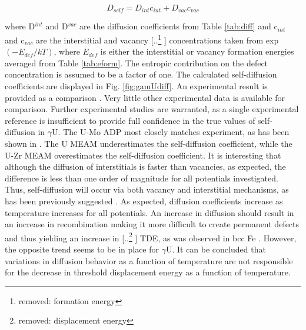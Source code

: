 \documentclass[review]{elsarticle}
\providecommand{\DIFaddtex}[1]{{\protect\color{blue} \sf #1}} %
\providecommand{\DIFdeltex}[1]{{\protect\color{red} [..\footnote{removed: #1} ]}} %
\providecommand{\DIFaddbegin}{} %
\providecommand{\DIFaddend}{} %
\providecommand{\DIFdelbegin}{} %
\providecommand{\DIFdelend}{} %
\providecommand{\DIFadd}[1]{\texorpdfstring{\DIFaddtex{#1}}{#1}} %
\providecommand{\DIFdel}[1]{\texorpdfstring{\DIFdeltex{#1}}{}} %
\newcommand{\DIFscaledelfig}{0.5}
\newlength{\DIFdelgraphicswidth} %
\newlength{\DIFdelgraphicsheight} %
\newcommand{\DIFaddincludegraphics}[2][]{{\color{blue}\fbox{\DIFOincludegraphics[#1]{#2}}}} %
\newcommand{\DIFdelincludegraphics}[2][]{%
\sbox{\DIFdelgraphicsbox}{\DIFOincludegraphics[#1]{#2}}%
\settoboxwidth{\DIFdelgraphicswidth}{\DIFdelgraphicsbox} %
\settoboxtotalheight{\DIFdelgraphicsheight}{\DIFdelgraphicsbox} %
\scalebox{\DIFscaledelfig}{%
\parbox[b]{\DIFdelgraphicswidth}{\usebox{\DIFdelgraphicsbox}\\[-\baselineskip] \rule{\DIFdelgraphicswidth}{0em}}\llap{\resizebox{\DIFdelgraphicswidth}{\DIFdelgraphicsheight}{%
\setlength{\unitlength}{\DIFdelgraphicswidth}%
\begin{picture}(1,1)%
\thicklines\linethickness{2pt} %
{\color[rgb]{1,0,0}\put(0,0){\framebox(1,1){}}}%
{\color[rgb]{1,0,0}\put(0,0){\line( 1,1){1}}}%
{\color[rgb]{1,0,0}\put(0,1){\line(1,-1){1}}}%
\end{picture}%
}\hspace*{3pt}}} %
} %
\DeclareRobustCommand{\DIFaddbegin}{\DIFOaddbegin \let\includegraphics\DIFaddincludegraphics} %
\DeclareRobustCommand{\DIFaddend}{\DIFOaddend \let\includegraphics\DIFOincludegraphics} %
\DeclareRobustCommand{\DIFdelbegin}{\DIFOdelbegin \let\includegraphics\DIFdelincludegraphics} %
\DeclareRobustCommand{\DIFdelend}{\DIFOaddend \let\includegraphics\DIFOincludegraphics} %
\begin{document}
\begin{equation}
\label{eqn:selfd}
D_{self} = D_{int}c_{int} + D_{vac}c_{vac}
\end{equation} 

where D$^{int}$ and D$^{vac}$ are the diffusion coefficients from Table \ref{tab:diff} and c$_{int}$ and c$_{vac}$ are the interstitial and vacancy \DIFdelbegin \DIFdel{formation energy }\DIFdelend \DIFaddbegin \DIFadd{concentrations }\DIFaddend taken from exp$(-E_{def}/kT)$, where $E_{def}$ is either the interstitial or vacancy formation energies averaged from Table \ref{tab:eform}. The entropic contribution on the defect concentration is assumed to be a factor of one. The calculated self-diffusion coefficients are displayed in Fig. \ref{fig:gamUdiff}. An experimental result is provided as a comparison \cite{adda1959}. Very little other experimental data is available for comparison. Further experimental studies are warranted, as a single experimental reference is insufficient to provide full confidence in the true values of self-diffusion in $\gamma$U. The U-Mo ADP most closely matches experiment, as has been shown in \cite{smirnovaADP}. The U MEAM underestimates the self-diffusion coefficient, while the U-Zr MEAM overestimates the self-diffusion coefficient. It is interesting that although the diffusion of interstitials is faster than vacancies, as expected, the difference is less than one order of magnitude for all potentials investigated. Thus, self-diffusion will occur via both vacancy and interstitial mechanisms, as has been previously suggested \cite{fedorov1978, smirnov1992}. As expected, diffusion coefficients increase as temperature increases for all potentials. An increase in diffusion should result in an increase in recombination making it more difficult to create permanent defects and thus yielding an increase in \DIFdelbegin \DIFdel{displacement energy}\DIFdelend \DIFaddbegin \DIFadd{TDE}\DIFaddend , as was observed in bcc Fe \cite{beeler2016}. However, the opposite trend seems to be in place for $\gamma$U. It can be concluded that variations in diffusion behavior as a function of temperature are not responsible for the decrease in \DIFaddbegin \DIFadd{threshold }\DIFaddend displacement energy as a function of temperature.
\end{document}
